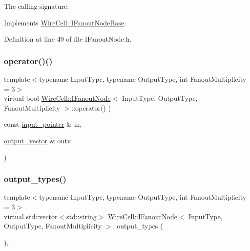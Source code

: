 The calling signature\+: 



Implements \hyperlink{class_wire_cell_1_1_i_fanout_node_base_a2d8314d252381eaeb96c43f312eda8b7}{Wire\+Cell\+::\+I\+Fanout\+Node\+Base}.



Definition at line 49 of file I\+Fanout\+Node.\+h.

\mbox{\label{class_wire_cell_1_1_i_fanout_node_abcb60d2f89bd18018883d55c9119952f}} 
\subsubsection{\texorpdfstring{operator()()}{operator()()}\hspace{0.1cm}{\footnotesize\ttfamily [2/2]}}
{\footnotesize\ttfamily template$<$typename Input\+Type, typename Output\+Type, int Fanout\+Multiplicity = 3$>$ \\
virtual bool \hyperlink{class_wire_cell_1_1_i_fanout_node}{Wire\+Cell\+::\+I\+Fanout\+Node}$<$ Input\+Type, Output\+Type, Fanout\+Multiplicity $>$\+::operator() (\begin{DoxyParamCaption}\item[{const \hyperlink{class_wire_cell_1_1_i_fanout_node_aefd36d56a531edf1990fe6e263d9c266}{input\+\_\+pointer} \&}]{in,  }\item[{\hyperlink{class_wire_cell_1_1_i_fanout_node_a650cda83709781daac2d67af7c3706df}{output\+\_\+vector} \&}]{outv }\end{DoxyParamCaption})\hspace{0.3cm}{\ttfamily [pure virtual]}}

\mbox{\label{class_wire_cell_1_1_i_fanout_node_a2191dc9d44b35d6ff4bda5d5356c6ac5}} 
\subsubsection{\texorpdfstring{output\+\_\+types()}{output\_types()}}
{\footnotesize\ttfamily template$<$typename Input\+Type, typename Output\+Type, int Fanout\+Multiplicity = 3$>$ \\
virtual std\+::vector$<$std\+::string$>$ \hyperlink{class_wire_cell_1_1_i_fanout_node}{Wire\+Cell\+::\+I\+Fanout\+Node}$<$ Input\+Type, Output\+Type, Fanout\+Multiplicity $>$\+::output\+\_\+types (\begin{DoxyParamCaption}{ }\end{DoxyParamCaption})\hspace{0.3cm}{\ttfamily [inline]}, {\ttfamily [virtual]}}




